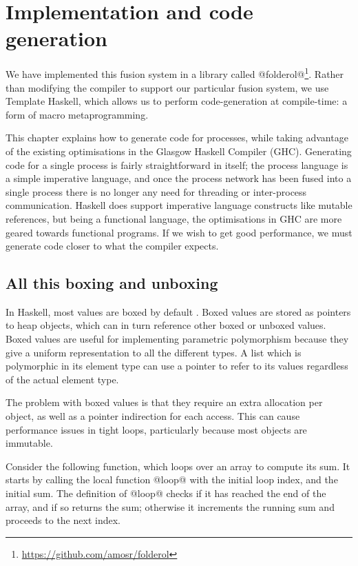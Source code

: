 \chapter{Implementation and code generation}
\label{chapter:process:implementation}


We have implemented this fusion system in a library called @folderol@\footnote{\url{https://github.com/amosr/folderol}}.
Rather than modifying the compiler to support our particular fusion system, we use Template Haskell, which allows us to perform code-generation at compile-time: a form of macro metaprogramming.

This chapter explains how to generate code for processes, while taking advantage of the existing optimisations in the Glasgow Haskell Compiler (GHC).
Generating code for a single process is fairly straightforward in itself; the process language is a simple imperative language, and once the process network has been fused into a single process there is no longer any need for threading or inter-process communication.
Haskell does support imperative language constructs like mutable references, but being a functional language, the optimisations in GHC are more geared towards functional programs.
If we wish to get good performance, we must generate code closer to what the compiler expects.

\section{All this boxing and unboxing}
In Haskell, most values are boxed by default \citep{jones1991unboxed}.
Boxed values are stored as pointers to heap objects, which can in turn reference other boxed or unboxed values.
Boxed values are useful for implementing parametric polymorphism because they give a uniform representation to all the different types.
A list which is polymorphic in its element type can use a pointer to refer to its values regardless of the actual element type.

The problem with boxed values is that they require an extra allocation per object, as well as a pointer indirection for each access.
This can cause performance issues in tight loops, particularly because most objects are immutable.

Consider the following function, which loops over an array to compute its sum.
It starts by calling the local function @loop@ with the initial loop index, and the initial sum.
The definition of @loop@ checks if it has reached the end of the array, and if so returns the sum; otherwise it increments the running sum and proceeds to the next index.

